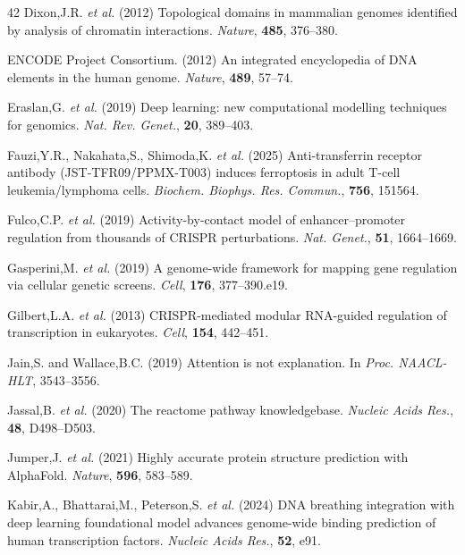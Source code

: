 \documentclass[12pt,a4paper]{article}
\begin{document}
\begin{thebibliography}{42}
Dixon,J.R. \textit{et al.} (2012) Topological domains in mammalian genomes identified by analysis of chromatin interactions. \textit{Nature}, \textbf{485}, 376--380.

ENCODE Project Consortium. (2012) An integrated encyclopedia of DNA elements in the human genome. \textit{Nature}, \textbf{489}, 57--74.

Eraslan,G. \textit{et al.} (2019) Deep learning: new computational modelling techniques for genomics. \textit{Nat. Rev. Genet.}, \textbf{20}, 389--403.

Fauzi,Y.R., Nakahata,S., Shimoda,K. \textit{et al.} (2025) Anti-transferrin receptor antibody (JST-TFR09/PPMX-T003) induces ferroptosis in adult T-cell leukemia/lymphoma cells. \textit{Biochem. Biophys. Res. Commun.}, \textbf{756}, 151564.

Fulco,C.P. \textit{et al.} (2019) Activity-by-contact model of enhancer--promoter regulation from thousands of CRISPR perturbations. \textit{Nat. Genet.}, \textbf{51}, 1664--1669.

Gasperini,M. \textit{et al.} (2019) A genome-wide framework for mapping gene regulation via cellular genetic screens. \textit{Cell}, \textbf{176}, 377--390.e19.

Gilbert,L.A. \textit{et al.} (2013) CRISPR-mediated modular RNA-guided regulation of transcription in eukaryotes. \textit{Cell}, \textbf{154}, 442--451.

Jain,S. and Wallace,B.C. (2019) Attention is not explanation. In \textit{Proc. NAACL-HLT}, 3543--3556.

Jassal,B. \textit{et al.} (2020) The reactome pathway knowledgebase. \textit{Nucleic Acids Res.}, \textbf{48}, D498--D503.

Jumper,J. \textit{et al.} (2021) Highly accurate protein structure prediction with AlphaFold. \textit{Nature}, \textbf{596}, 583--589.

Kabir,A., Bhattarai,M., Peterson,S. \textit{et al.} (2024) DNA breathing integration with deep learning foundational model advances genome-wide binding prediction of human transcription factors. \textit{Nucleic Acids Res.}, \textbf{52}, e91.


\end{thebibliography}
\end{document}

